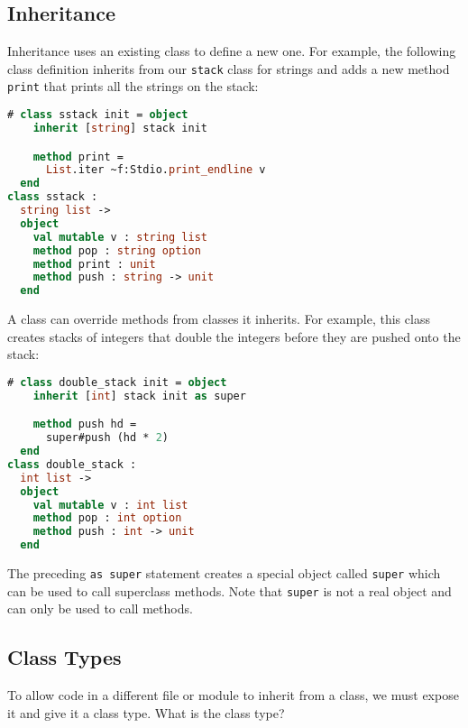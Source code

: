 \hypertarget{inheritance}{%
\subsection{Inheritance}\label{inheritance}}

Inheritance uses an existing class to define a new one. For example, the
following class definition inherits from our
\passthrough{\lstinline!stack!} class for strings and adds a new method
\passthrough{\lstinline!print!} that prints all the strings on the
stack: 

\begin{lstlisting}[language=Caml]
# class sstack init = object
    inherit [string] stack init

    method print =
      List.iter ~f:Stdio.print_endline v
  end
class sstack :
  string list ->
  object
    val mutable v : string list
    method pop : string option
    method print : unit
    method push : string -> unit
  end
\end{lstlisting}

A class can override methods from classes it inherits. For example, this
class creates stacks of integers that double the integers before they
are pushed onto the stack:

\begin{lstlisting}[language=Caml]
# class double_stack init = object
    inherit [int] stack init as super

    method push hd =
      super#push (hd * 2)
  end
class double_stack :
  int list ->
  object
    val mutable v : int list
    method pop : int option
    method push : int -> unit
  end
\end{lstlisting}

The preceding \passthrough{\lstinline!as super!} statement creates a
special object called \passthrough{\lstinline!super!} which can be used
to call superclass methods. Note that \passthrough{\lstinline!super!} is
not a real object and can only be used to call methods.

\hypertarget{class-types}{%
\subsection{Class Types}\label{class-types}}

To allow code in a different file or module to inherit from a class, we
must expose it and give it a class type. What is the class type?

